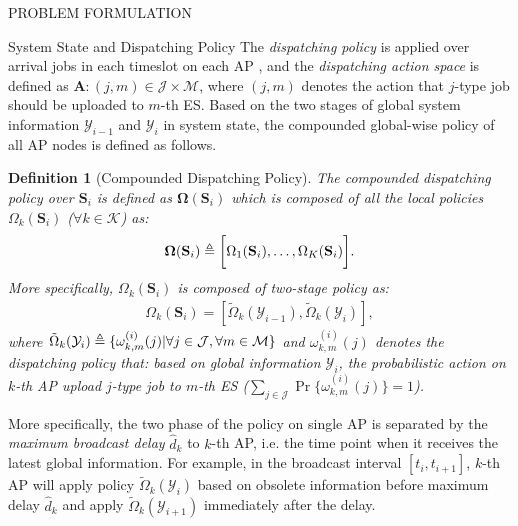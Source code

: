\documentclass[10pt, conference, letterpaper]{IEEEtran}
\newtheorem{definition}{Definition}
\newcommand{\define}{\triangleq}
\renewcommand{\vec}{\mathbf}
\DeclarePairedDelimiter{\set}{\{}{\}}
\DeclarePairedDelimiter{\Bracket}{\bigg[}{\bigg]}
\newcommand{\apSet}{\mathcal{K}}
\newcommand{\esSet}{\mathcal{M}}
\newcommand{\jSpace}{\mathcal{J}}
\newcommand{\Stat}{\mathbf{S}}
\newcommand{\Obsv}{\mathcal{Y}}
\newcommand{\Policy}{\mathbf{\Omega}}
\begin{document}
\begin{section}{PROBLEM FORMULATION}
\begin{subsection}{System State and Dispatching Policy}
            The \emph{dispatching policy} is applied over arrival jobs in each timeslot on each AP
            , and the \emph{dispatching action space} is defined as $\mathbf{A}: (j, m) \in \jSpace \times \esSet$, where $(j, m)$ denotes the action that $j$-type job should be uploaded to $m$-th ES.
            Based on the two stages of global system information $\Obsv_{i-1}$ and $\Obsv_{i}$ in system state, the compounded global-wise policy of all AP nodes is defined as follows.
            \begin{definition}[Compounded Dispatching Policy]
                The compounded dispatching policy over $\Stat_{i}$ is defined as $\Policy(\Stat_{i})$ which is composed of all the local policies $\Omega_k(\Stat_{i})$ ($\forall k\in\apSet$) as:
                \begin{align}
                    \vec{\Omega}(\Stat_{i}) \define \Bracket{\Omega_1(\Stat_{i}), \dots, \Omega_K(\Stat_{i})}.
                \end{align}
                More specifically, $\Omega_k(\Stat_{i})$ is composed of two-stage policy as:
                \begin{align}
                    \Omega_k(\Stat_i) = [\tilde{\Omega}_k(\Obsv_{i-1}), \tilde{\Omega}_k(\Obsv_{i})],
                \end{align}
                where $\tilde{\Omega}_k(\Obsv_{i}) \define \set{\omega^{(i)}_{k,m}(j)|\forall j\in\jSpace, \forall m\in\esSet}$ and $\omega^{(i)}_{k,m}(j)$ denotes the dispatching policy that: based on global information $\Obsv_{i}$, the probabilistic action on $k$-th AP upload $j$-type job to $m$-th ES ($\sum_{j\in\jSpace} \Pr\{\omega^{(i)}_{k,m}(j)\}=1$).
            \end{definition}
            More specifically, the two phase of the policy on single AP is separated by the \emph{maximum broadcast delay} $\hat{d}_k$ to $k$-th AP, i.e. the time point when it receives the latest global information. For example, in the broadcast interval $[t_{i}, t_{i+1}]$, $k$-th AP will apply policy $\tilde{\Omega}_k(\Obsv_{i})$ based on obsolete information before maximum delay $\hat{d}_k$ and apply $\tilde{\Omega}_k(\Obsv_{i+1})$ immediately after the delay.
        \end{subsection}


\end{section}
\end{document}
